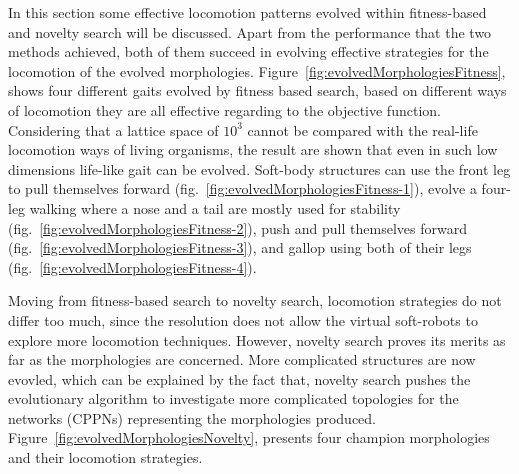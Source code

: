 In this section some effective locomotion patterns evolved within fitness-based and novelty search will be discussed. Apart from the performance that the two methods achieved, both of them succeed in evolving effective strategies for the locomotion of the evolved morphologies. Figure~\ref{fig:evolvedMorphologiesFitness}, shows four different gaits evolved by fitness based search, based on different ways of locomotion they are all effective regarding to the objective function. Considering that a lattice space of $10^3$ cannot be compared with the real-life locomotion ways of living organisms, the result are shown that even in such low dimensions life-like gait can be evolved. Soft-body structures can use the front leg to pull themselves forward (fig.~\ref{fig:evolvedMorphologiesFitness-1}), evolve a four-leg walking where a nose and a tail are mostly used for stability (fig.~\ref{fig:evolvedMorphologiesFitness-2}), push and pull themselves forward (fig.~\ref{fig:evolvedMorphologiesFitness-3}), and gallop using both of their legs (fig.~\ref{fig:evolvedMorphologiesFitness-4}). 

Moving from fitness-based search to novelty search, locomotion strategies do not differ too much, since the resolution does not allow the virtual soft-robots to explore more locomotion techniques. However, novelty search proves its merits as far as the morphologies are concerned. More complicated structures are now evovled, which can be explained by the fact that, novelty search pushes the evolutionary algorithm to investigate more complicated topologies for the networks (CPPNs) representing the morphologies produced. Figure~\ref{fig:evolvedMorphologiesNovelty}, presents four champion morphologies and their locomotion strategies. 





\clearpage


